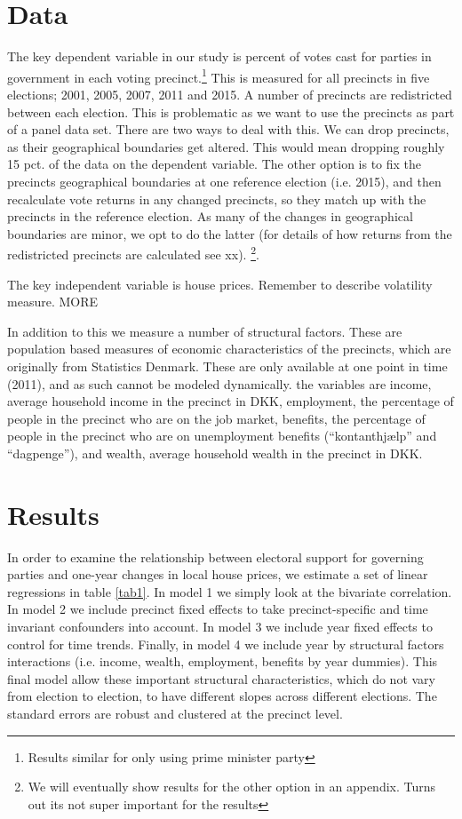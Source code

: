 \documentclass[12pt,a4paper]{article}
\begin{document}
\section{Data}
The key dependent variable in our study is percent of votes cast for parties in government in each voting precinct.\footnote{Results similar for only using prime minister party} This is measured for all precincts in five elections; 2001, 2005, 2007, 2011 and 2015. A number of precincts are redistricted between each election. This is problematic as we want to use  the precincts as part of a panel data set. There are two ways to deal with this. We can drop precincts, as their geographical boundaries get altered. This would mean dropping roughly 15 pct. of the data on the dependent variable. The other option is to fix the precincts geographical boundaries at one reference election (i.e. 2015), and then recalculate vote returns in any changed precincts, so they match up with the precincts in the reference election.  As many of the changes in geographical boundaries are minor, we opt to do the latter (for details of how returns from the redistricted precincts are calculated see xx). \footnote{We will eventually show results for the other option in an appendix. Turns out its not super important for the results}. 

The key independent variable is house prices. Remember to describe volatility measure. MORE

In addition to this we measure a number of structural factors. These are population based measures of economic characteristics of the precincts, which are originally from Statistics Denmark. These are only available at one point in time (2011), and as such cannot be modeled dynamically. the variables are income, average household income in the precinct in DKK,  employment, the percentage of people in the precinct who are on the job market, benefits, the percentage of people in the precinct who are on unemployment benefits (``kontanthjælp'' and ``dagpenge''), and wealth, average household wealth in the precinct in DKK.  


\section{Results}
In order to examine the relationship between electoral support for governing parties and one-year changes in local house prices, we estimate a set of linear regressions in table \ref{tab1}. In model 1 we simply look at the bivariate correlation. In model 2 we include precinct fixed effects to take precinct-specific and time invariant confounders into account. In model 3 we include year fixed effects to control for time trends. Finally, in model 4 we include year by structural factors interactions (i.e. income, wealth, employment, benefits by year dummies). This final model allow these important structural characteristics, which do not vary from election to election, to have different slopes across different elections. The standard errors are robust and clustered at the precinct level.
\end{document}

